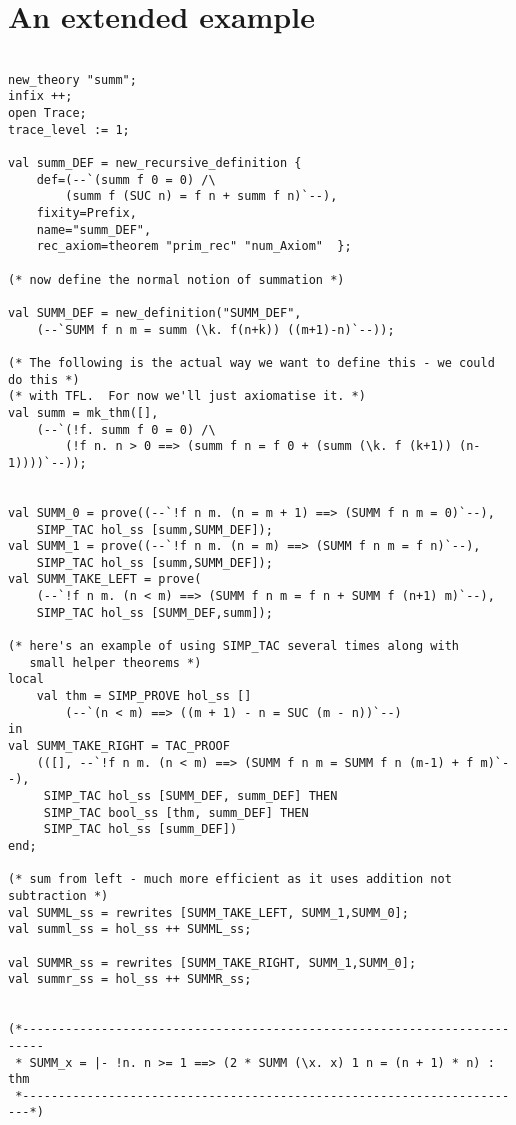 \section{An extended example}
\label{extended-example}

\begin{verbatim}

new_theory "summ";
infix ++;
open Trace;
trace_level := 1;

val summ_DEF = new_recursive_definition {
    def=(--`(summ f 0 = 0) /\
        (summ f (SUC n) = f n + summ f n)`--),
    fixity=Prefix,
    name="summ_DEF",
    rec_axiom=theorem "prim_rec" "num_Axiom"  };

(* now define the normal notion of summation *)

val SUMM_DEF = new_definition("SUMM_DEF",
    (--`SUMM f n m = summ (\k. f(n+k)) ((m+1)-n)`--));

(* The following is the actual way we want to define this - we could do this *)
(* with TFL.  For now we'll just axiomatise it. *)
val summ = mk_thm([],
    (--`(!f. summ f 0 = 0) /\
        (!f n. n > 0 ==> (summ f n = f 0 + (summ (\k. f (k+1)) (n-1))))`--));


val SUMM_0 = prove((--`!f n m. (n = m + 1) ==> (SUMM f n m = 0)`--),
    SIMP_TAC hol_ss [summ,SUMM_DEF]);
val SUMM_1 = prove((--`!f n m. (n = m) ==> (SUMM f n m = f n)`--),
    SIMP_TAC hol_ss [summ,SUMM_DEF]);
val SUMM_TAKE_LEFT = prove(
    (--`!f n m. (n < m) ==> (SUMM f n m = f n + SUMM f (n+1) m)`--),
    SIMP_TAC hol_ss [SUMM_DEF,summ]);

(* here's an example of using SIMP_TAC several times along with
   small helper theorems *)
local
    val thm = SIMP_PROVE hol_ss []
        (--`(n < m) ==> ((m + 1) - n = SUC (m - n))`--)
in
val SUMM_TAKE_RIGHT = TAC_PROOF
    (([], --`!f n m. (n < m) ==> (SUMM f n m = SUMM f n (m-1) + f m)`--),
     SIMP_TAC hol_ss [SUMM_DEF, summ_DEF] THEN
     SIMP_TAC bool_ss [thm, summ_DEF] THEN
     SIMP_TAC hol_ss [summ_DEF])
end;

(* sum from left - much more efficient as it uses addition not subtraction *)
val SUMML_ss = rewrites [SUMM_TAKE_LEFT, SUMM_1,SUMM_0];
val summl_ss = hol_ss ++ SUMML_ss;

val SUMMR_ss = rewrites [SUMM_TAKE_RIGHT, SUMM_1,SUMM_0];
val summr_ss = hol_ss ++ SUMMR_ss;


(*-------------------------------------------------------------------------
 * SUMM_x = |- !n. n >= 1 ==> (2 * SUMM (\x. x) 1 n = (n + 1) * n) : thm
 *-----------------------------------------------------------------------*)


\end{verbatim}
